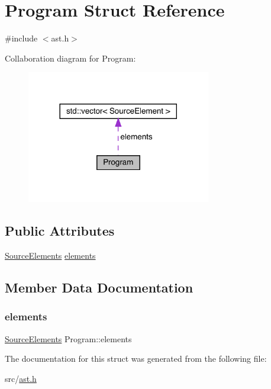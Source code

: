 \hypertarget{struct_program}{}\section{Program Struct Reference}
\label{struct_program}


{\ttfamily \#include $<$ast.\+h$>$}



Collaboration diagram for Program\+:\nopagebreak
\begin{figure}[H]
\begin{center}
\leavevmode
\includegraphics[width=228pt]{struct_program__coll__graph}
\end{center}
\end{figure}
\subsection*{Public Attributes}
\begin{DoxyCompactItemize}
\item 
\hyperlink{ast_8h_ae3267d5aa063c01bcbdeb38763a616ac}{Source\+Elements} \hyperlink{struct_program_aad088b92a8fc3f56270b1e0195e2f928}{elements}
\end{DoxyCompactItemize}


\subsection{Member Data Documentation}
\mbox{\label{struct_program_aad088b92a8fc3f56270b1e0195e2f928}} 
\subsubsection{\texorpdfstring{elements}{elements}}
{\footnotesize\ttfamily \hyperlink{ast_8h_ae3267d5aa063c01bcbdeb38763a616ac}{Source\+Elements} Program\+::elements}



The documentation for this struct was generated from the following file\+:\begin{DoxyCompactItemize}
\item 
src/\hyperlink{ast_8h}{ast.\+h}\end{DoxyCompactItemize}
